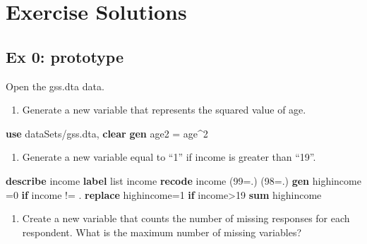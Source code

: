 \documentclass[
]{book}
\newenvironment{Shaded}{\begin{snugshade}}{\end{snugshade}}
\newcommand{\KeywordTok}[1]{\textcolor[rgb]{0.13,0.29,0.53}{\textbf{#1}}}
\newcommand{\NormalTok}[1]{#1}
\newcommand{\OtherTok}[1]{\textcolor[rgb]{0.56,0.35,0.01}{#1}}
\providecommand{\tightlist}{%
  \setlength{\itemsep}{0pt}\setlength{\parskip}{0pt}}
\begin{document}
\hypertarget{exercise-solutions-7}{%
\section{Exercise Solutions}\label{exercise-solutions-7}}

\hypertarget{ex-0-prototype-7}{%
\subsection{Ex 0: prototype}\label{ex-0-prototype-7}}

Open the gss.dta data.

\begin{enumerate}
\def\labelenumi{\arabic{enumi}.}
\tightlist
\item
  Generate a new variable that represents the squared value of age.
\end{enumerate}

\begin{Shaded}
\begin{Highlighting}[]
     \KeywordTok{use}\NormalTok{ dataSets/gss.dta, }\KeywordTok{clear}
     \KeywordTok{gen}\NormalTok{ age2 = age^2}
\end{Highlighting}
\end{Shaded}

\begin{enumerate}
\def\labelenumi{\arabic{enumi}.}
\setcounter{enumi}{1}
\tightlist
\item
  Generate a new variable equal to ``1'' if income is greater than ``19''.
\end{enumerate}

\begin{Shaded}
\begin{Highlighting}[]
     \KeywordTok{describe}\NormalTok{ income}
     \KeywordTok{label} \OtherTok{list}\NormalTok{ income}
     \KeywordTok{recode}\NormalTok{ income (99=.) (98=.)}
     \KeywordTok{gen}\NormalTok{ highincome =0 }\KeywordTok{if}\NormalTok{ income != .}
     \KeywordTok{replace}\NormalTok{ highincome=1 }\KeywordTok{if}\NormalTok{ income>19}
     \KeywordTok{sum}\NormalTok{ highincome}
\end{Highlighting}
\end{Shaded}

\begin{enumerate}
\def\labelenumi{\arabic{enumi}.}
\setcounter{enumi}{2}
\tightlist
\item
  Create a new variable that counts the number of missing responses for each respondent. What is the maximum number of missing variables?
\end{enumerate}
\end{document}
